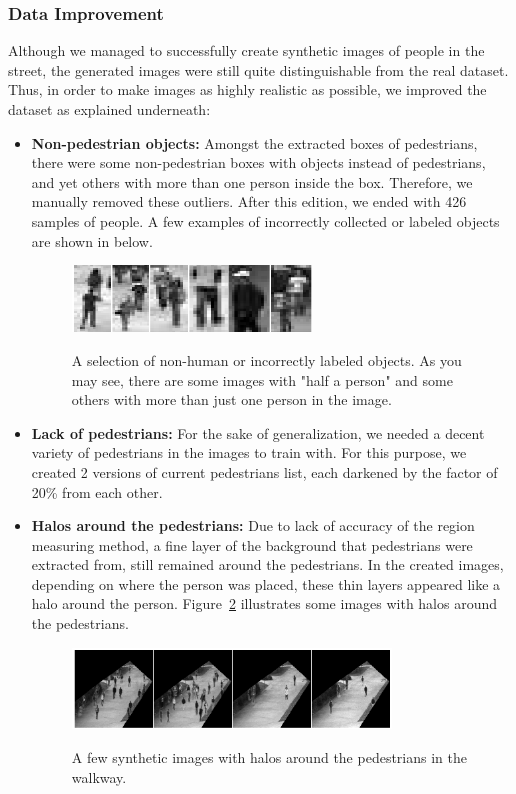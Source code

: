 \subsubsection{Data Improvement}
\label{dataimp}
Although we managed to successfully create synthetic images of people in the street, the generated images were still quite distinguishable from the real dataset. Thus, in order to make images as highly realistic as possible, we improved the dataset as explained underneath:
\begin{itemize}
\item \textbf{Non-pedestrian objects:} Amongst the extracted boxes of pedestrians, there were some non-pedestrian boxes with objects instead of pedestrians, and yet others with more than one person inside the box. Therefore, we manually removed these outliers. After this edition, we ended with 426 samples of people. A few examples of incorrectly collected or labeled objects are shown in below.

\begin{figure}[H]
	\centering
	{\includegraphics[width=0.6\textwidth]{images/nonped}}
	\caption{A selection of non-human or incorrectly labeled objects. As you may see, there are some images with "half a person" and some others with more than just one person in the image.}
	\label{fig:nonped}
\end{figure}
 
\item \textbf{Lack of pedestrians:} For the sake of generalization, we needed a decent variety of pedestrians in the images to train with. For this purpose, we created 2 versions of current pedestrians list, each darkened by the factor of 20\% from each other. 
\item \textbf{Halos around the pedestrians:} Due to lack of accuracy of the region measuring method, a fine layer of the background that pedestrians were extracted from, still remained around the pedestrians. In the created images, depending on where the person was placed, these thin layers appeared like a halo around the person. Figure~\ref{fig:haloim} illustrates some images with halos around the pedestrians. 
\begin{figure}[H]
	\centering
	{\includegraphics[width=0.8\textwidth]{images/halo}}
	\caption{A few synthetic images with halos around the pedestrians in the walkway.}
	\label{fig:haloim}
\end{figure}
 

\end{itemize}
